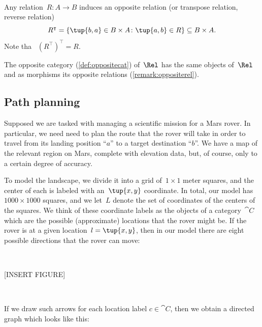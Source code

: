 \

\begin{remark}
\label{remark:oppositerel}
Any relation~$R\colon A\to B$ induces an opposite relation (or transpose relation, reverse relation) \begin{equation}
    R^\intercal =\{\tup{b,a}\in B\times A\colon \tup{a,b}\in R\} \subseteq B\times A.
\end{equation}
Note tha~ $\left( R^\intercal\right)^\intercal = R$.
\end{remark}

\begin{remark}
The opposite category (\cref{def:oppositecat}) of~$\Rel$ has the same objects of~$\Rel$ and as morphisms its opposite relations (\cref{remark:oppositerel}). 
\end{remark}

 
\subsection{Path planning}
\label{sec:trekking}


Supposed we are tasked with managing a scientific mission for a Mars rover. In particular, we need need to plan the route that the rover will take in order to travel from its landing position ``$a$'' to a target destination ``$b$''. We have a map of the relevant region on Mars, complete with elevation data, but, of course, only to a certain degree of accuracy. 

To model the landscape, we divide it into a grid of~$1 \times 1$ meter squares, and the center of each is labeled with an~$\tup{x,y}$ coordinate. In total, our model has~$1000 \times 1000$ squares, and we let~$L$ denote the set of coordinates of the centers of the squares. We think of these coordinate labels as the objects of a category~$\cat{C}$ which are the possible (approximate) locations that the rover might be. If the rover is at a given location~$l = \tup{x,y}$, then in our model there are eight possible directions that the rover can move:

\

[INSERT FIGURE]

\


If we draw such arrows for each location label $c \in \cat{C}$, then we obtain a directed graph which looks like this: 

